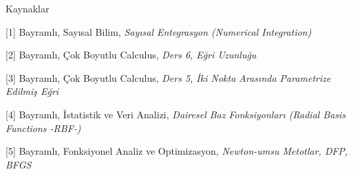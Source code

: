 \documentclass[12pt,fleqn]{article}\usepackage{../../common}
\begin{document}
Kaynaklar 

[1] Bayramlı, Sayısal Bilim, {\em Sayısal Entegrasyon (Numerical Integration)}

[2] Bayramlı, Çok Boyutlu Calculus, {\em Ders 6, Eğri Uzunluğu}

[3] Bayramlı, Çok Boyutlu Calculus, {\em Ders 5, İki Nokta Arasında Parametrize Edilmiş Eğri}

[4] Bayramlı, İstatistik ve Veri Analizi, {\em Dairesel Baz Fonksiyonları (Radial Basis Functions -RBF-)}

[5] Bayramlı, Fonksiyonel Analiz ve Optimizasyon, {\em Newton-umsu Metotlar, DFP, BFGS }
\end{document}

